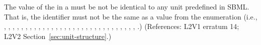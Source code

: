 The value of the   in a \UnitDefinition must be  not be
identical to any unit predefined in SBML.  That is, the identifier
must not be the same as a value from the 
enumeration (i.e.,
,
,
,
,
,
,
,
,
,
,
,
,
,
,
,
,
,
,
,
,
,
,
,
,
,
,
,
,
,
,
,
.)
(References: L2V1 erratum 14; L2V2
Section~\ref{sec:unit-structure}.)
